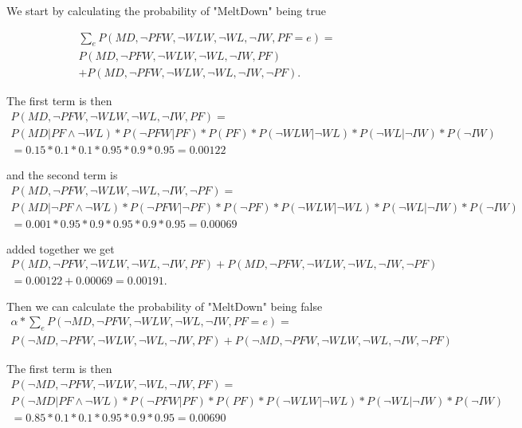 \documentclass[a4paper,10pt]{article}
\begin{document}
We start by calculating the probability of "MeltDown" being true

\begin{multline*}
	\sum_e P(MD, \neg PFW, \neg WLW, \neg WL, \neg IW, PF = e) = \\
	P(MD, \neg PFW, \neg WLW, \neg WL, \neg IW, PF) \\
	+ P(MD, \neg PFW, \neg WLW, \neg WL, \neg IW, \neg PF).
\end{multline*}

The first term is then
\begin{multline*}
	P(MD, \neg PFW, \neg WLW, \neg WL, \neg IW, PF) = \\
	P(MD | PF \wedge \neg WL) * P(\neg PFW | PF) * P(PF) * P(\neg WLW | \neg WL) * P(\neg WL | \neg IW) * P(\neg IW) \\ 
	= 0.15 * 0.1 * 0.1 * 0.95 * 0.9 * 0.95 = 0.00122
\end{multline*}

and the second term is
\begin{multline*}
	P(MD, \neg PFW, \neg WLW, \neg WL, \neg IW, \neg PF) = \\
	P(MD | \neg PF \wedge \neg WL) * P(\neg PFW | \neg PF) * P(\neg PF) * P(\neg WLW | \neg WL) * P(\neg WL | \neg IW) * P(\neg IW) \\
	= 0.001 * 0.95 * 0.9 * 0.95 * 0.9 * 0.95 = 0.00069
\end{multline*}

added together we get
\begin{multline}
	P(MD, \neg PFW, \neg WLW, \neg WL, \neg IW, PF) + P(MD, \neg PFW, \neg WLW, \neg WL, \neg IW, \neg PF) \\ 
	= 0.00122 + 0.00069 = 0.00191.
\end{multline}

Then we can calculate the probability of "MeltDown" being false
\begin{multline*}
	\alpha * \sum_e P(\neg MD, \neg PFW, \neg WLW, \neg WL, \neg IW, PF = e) = \\
	P(\neg MD, \neg PFW, \neg WLW, \neg WL, \neg IW, PF) + P(\neg MD, \neg PFW, \neg WLW, \neg WL, \neg IW, \neg PF)
\end{multline*}

The first term is then
\begin{multline}
	P(\neg MD, \neg PFW, \neg WLW, \neg WL, \neg IW, PF) = \\
	P(\neg MD | PF \wedge \neg WL) * P(\neg PFW | PF) * P(PF) * P(\neg WLW | \neg WL) * P(\neg WL | \neg IW) * P(\neg IW) \\
	= 0.85 * 0.1 * 0.1 * 0.95 * 0.9 * 0.95 = 0.00690
\end{multline}
\end{document}
